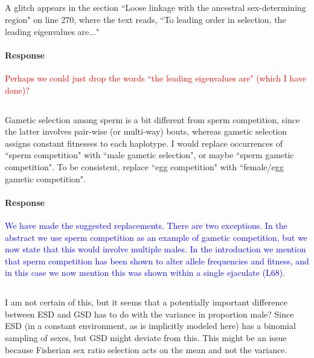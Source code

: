 \documentclass[10pt,letterpaper]{article}
\begin{document}
\noindent\subsection{}
A glitch appears in the section ``Loose linkage with the ancestral sex-determining region" on line 270, where the text reads, ``To leading order in selection, the leading eigenvalues are..."

\noindent\paragraph{Response}
\textcolor{red}{Perhaps we could just drop the words ``the leading eigenvalues are" (which I have done)?}

\noindent\subsection{}
Gametic selection among sperm is a bit different from sperm competition, since the latter involves pair-wise (or multi-way) bouts, whereas gametic selection assigns constant fitnesses to each haplotype. I would replace occurrences of ``sperm competition" with ``male gametic selection", or maybe ``sperm gametic competition". To be consistent, replace ``egg competition" with ``female/egg gametic competition". 

\noindent\paragraph{Response}
\textcolor{blue}{We have made the suggested replacements. There are two exceptions. In the abstract we use sperm competition as an example of gametic competition, but we now state that this would involve multiple males. In the introduction we mention that sperm competition has been shown to alter allele frequencies and fitness, and in this case we now mention this was shown within a single ejaculate (L68).}

\noindent\subsection{}
I am not certain of this, but it seems that a potentially important difference between ESD and GSD has to do with the variance in proportion male? Since ESD (in a constant environment, as is implicitly modeled here) has a binomial sampling of sexes, but GSD might deviate from this.  This might be an issue because Fisherian sex ratio selection acts on the mean and not the variance.
\end{document}
